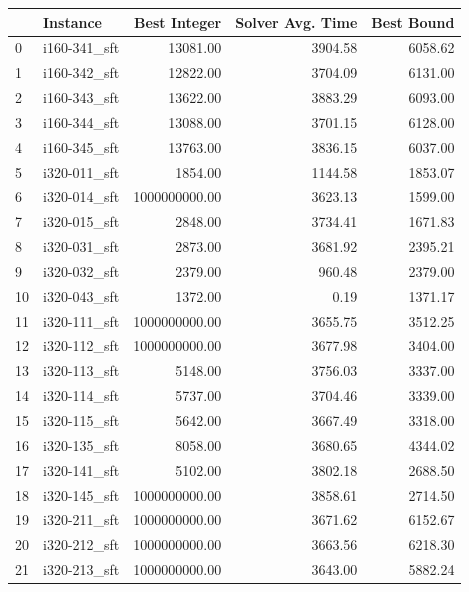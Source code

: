 \begin{tabular}{llrrr}
\toprule
{} &      Instance &  Best Integer &  Solver Avg. Time &  Best Bound \\
\midrule
0  &  i160-341\_sft &      13081.00 &           3904.58 &     6058.62 \\
1  &  i160-342\_sft &      12822.00 &           3704.09 &     6131.00 \\
2  &  i160-343\_sft &      13622.00 &           3883.29 &     6093.00 \\
3  &  i160-344\_sft &      13088.00 &           3701.15 &     6128.00 \\
4  &  i160-345\_sft &      13763.00 &           3836.15 &     6037.00 \\
5  &  i320-011\_sft &       1854.00 &           1144.58 &     1853.07 \\
6  &  i320-014\_sft & 1000000000.00 &           3623.13 &     1599.00 \\
7  &  i320-015\_sft &       2848.00 &           3734.41 &     1671.83 \\
8  &  i320-031\_sft &       2873.00 &           3681.92 &     2395.21 \\
9  &  i320-032\_sft &       2379.00 &            960.48 &     2379.00 \\
10 &  i320-043\_sft &       1372.00 &              0.19 &     1371.17 \\
11 &  i320-111\_sft & 1000000000.00 &           3655.75 &     3512.25 \\
12 &  i320-112\_sft & 1000000000.00 &           3677.98 &     3404.00 \\
13 &  i320-113\_sft &       5148.00 &           3756.03 &     3337.00 \\
14 &  i320-114\_sft &       5737.00 &           3704.46 &     3339.00 \\
15 &  i320-115\_sft &       5642.00 &           3667.49 &     3318.00 \\
16 &  i320-135\_sft &       8058.00 &           3680.65 &     4344.02 \\
17 &  i320-141\_sft &       5102.00 &           3802.18 &     2688.50 \\
18 &  i320-145\_sft & 1000000000.00 &           3858.61 &     2714.50 \\
19 &  i320-211\_sft & 1000000000.00 &           3671.62 &     6152.67 \\
20 &  i320-212\_sft & 1000000000.00 &           3663.56 &     6218.30 \\
21 &  i320-213\_sft & 1000000000.00 &           3643.00 &     5882.24 \\

\end{tabular}
